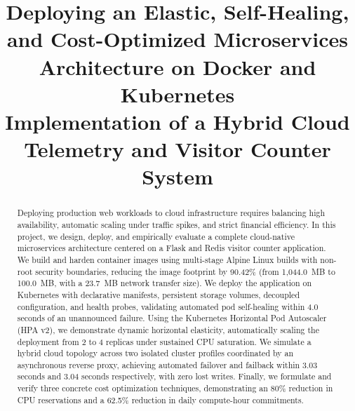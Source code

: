 \documentclass[conference]{IEEEtran}
\begin{document}

\title{Deploying an Elastic, Self-Healing, and Cost-Optimized Microservices Architecture on Docker and Kubernetes\\
\vspace{0.2cm}\large Implementation of a Hybrid Cloud Telemetry and Visitor Counter System}

\author{
}

\maketitle

\begin{abstract}
Deploying production web workloads to cloud infrastructure requires balancing high availability, automatic scaling under traffic spikes, and strict financial efficiency. In this project, we design, deploy, and empirically evaluate a complete cloud-native microservices architecture centered on a Flask and Redis visitor counter application. We build and harden container images using multi-stage Alpine Linux builds with non-root security boundaries, reducing the image footprint by 90.42\% (from 1,044.0~MB to 100.0~MB, with a 23.7~MB network transfer size). We deploy the application on Kubernetes with declarative manifests, persistent storage volumes, decoupled configuration, and health probes, validating automated pod self-healing within 4.0 seconds of an unannounced failure. Using the Kubernetes Horizontal Pod Autoscaler (HPA v2), we demonstrate dynamic horizontal elasticity, automatically scaling the deployment from 2 to 4 replicas under sustained CPU saturation. We simulate a hybrid cloud topology across two isolated cluster profiles coordinated by an asynchronous reverse proxy, achieving automated failover and failback within 3.03 seconds and 3.04 seconds respectively, with zero lost writes. Finally, we formulate and verify three concrete cost optimization techniques, demonstrating an 80\% reduction in CPU reservations and a 62.5\% reduction in daily compute-hour commitments.
\end{abstract}
\end{document}
